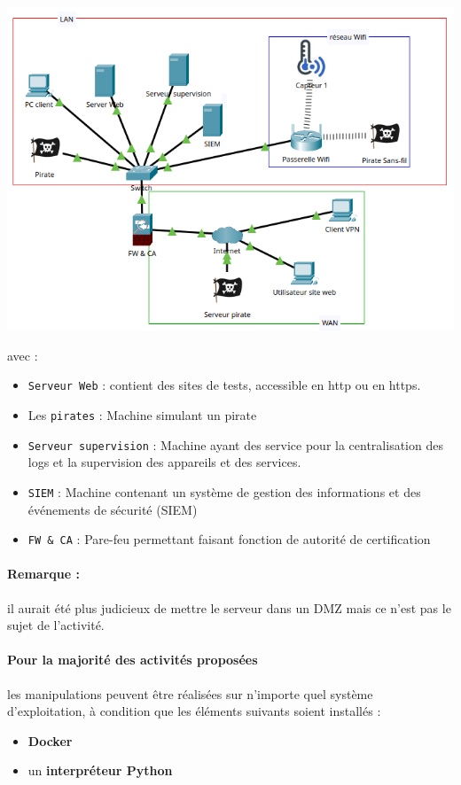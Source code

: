 \documentclass[french, 12pt]{article}%
\newcommand{\itemE}{\item[$\bullet$]}
\begin{document}
\begin{center}
\includegraphics[scale=0.7]{./ressource/environnement.png}
\end{center}
avec : 
\begin{itemize}
\itemE \verb?Serveur Web? : contient des sites de tests, accessible en http ou en https. 
\itemE Les \verb?pirates? : Machine simulant un pirate
\itemE \verb?Serveur supervision? : Machine ayant des service pour la centralisation des logs et la supervision des appareils et des services. 
\itemE \verb?SIEM? : Machine contenant un système de gestion des informations et des événements de sécurité (SIEM)
\itemE \verb?FW & CA? : Pare-feu permettant faisant fonction de autorité de certification
\end{itemize}

\paragraph{Remarque :} il aurait été plus judicieux de mettre le serveur dans un DMZ mais ce n'est pas le sujet de l'activité.  


\paragraph{Pour la majorité des activités proposées} les manipulations peuvent être réalisées sur n'importe quel système d'exploitation, à condition que les éléments suivants soient installés :
\begin{itemize}
  \itemE \textbf{Docker}
  \itemE un \textbf{interpréteur Python}
\end{itemize}
\end{document}
